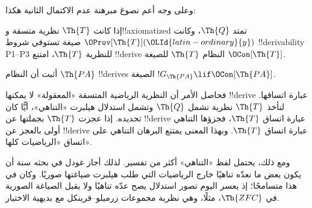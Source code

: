 \documentclass[../../../include/open-logic-section]{subfiles}
\begin{document}
وعلى وجه أعم نصوغ مبرهنة عدم الاكتمال الثانية هكذا:

\begin{thm}
 إذا كانت $\Th{T}$
نظرية متسقة و!!{axiomatized} تمتد $\Th{Q}$، وكانت
$\OProv[\Th{T}]({\OLId{latin-ordinary}{y}})$ صيغة تستوفي شروط !!{derivability}
P1--P3 للنظرية $\Th{T}$، امتنع !!{derive} النظام
$\Th{T}$ للصيغة $\OCon[\Th{T}]$.
\end{thm}

\begin{prob}
أثبت أن النظام $\Th{PA}$ !!{derive}s الصيغة
$!G_{\Th{PA}} \lif \OCon[\Th{PA}]$.
\end{prob}

\begin{digress}
فحاصل الأمر أن النظرية الرياضية المتسقة «المعقولة» لا يمكنها
!!{derive} عبارة اتساقها. لنأخذ $\Th{T}$ نظرية تشمل
$\Th{Q}$ وتشمل استدلال هيلبرت «التناهي»، أيًّا كان تحديده.
إذا عجزت $\Th{T}$ بجملتها عن !!{derive} عبارة اتساق $\Th{T}$،
فجزؤها التناهي أولى بالعجز عن !!{derive} عبارة اتساق $\Th{T}$.
وبهذا المعنى يمتنع البرهان التناهي على اتساق «الرياضيات كلها».

ومع ذلك، يحتمل لفظ «التناهي» أكثر من تفسير. لذلك أجاز غودل
في بحثه سنة  أن يكون بعض ما نعدّه تناهيًا خارج الرياضيات التي
طلب هيلبرت صياغتها صوريًا. وكان في هذا متسامحًا؛ إذ يعسر اليوم
تصور استدلال يصح عدّه تناهيًا ولا يقبل الصياغة الصورية في
$\Th{ZFC}$، مثلًا، وهي نظرية مجموعات زرميلو--فرينكل مع بديهية
الاختيار.
\end{digress}
\end{document}
